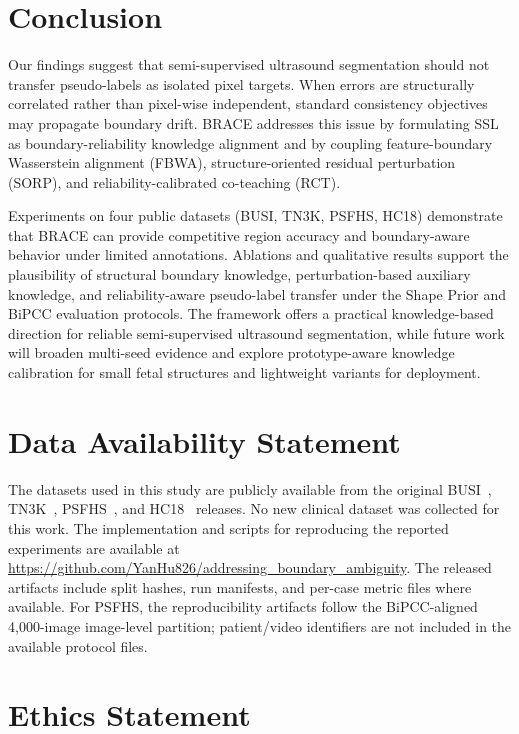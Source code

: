 \documentclass[a4paper,fleqn]{cas-dc}
\begin{document}
\section{Conclusion}

Our findings suggest that semi-supervised ultrasound segmentation should not transfer pseudo-labels as isolated pixel targets. When errors are structurally correlated rather than pixel-wise independent, standard consistency objectives may propagate boundary drift. BRACE addresses this issue by formulating SSL as boundary-reliability knowledge alignment and by coupling feature-boundary Wasserstein alignment (FBWA), structure-oriented residual perturbation (SORP), and reliability-calibrated co-teaching (RCT).

Experiments on four public datasets (BUSI, TN3K, PSFHS, HC18) demonstrate that BRACE can provide competitive region accuracy and boundary-aware behavior under limited annotations. Ablations and qualitative results support the plausibility of structural boundary knowledge, perturbation-based auxiliary knowledge, and reliability-aware pseudo-label transfer under the Shape Prior and BiPCC evaluation protocols. The framework offers a practical knowledge-based direction for reliable semi-supervised ultrasound segmentation, while future work will broaden multi-seed evidence and explore prototype-aware knowledge calibration for small fetal structures and lightweight variants for deployment.

\section{Data Availability Statement}

The datasets used in this study are publicly available from the original BUSI~\cite{b1}, TN3K~\cite{b4}, PSFHS~\cite{b53}, and HC18~\cite{b54} releases. No new clinical dataset was collected for this work. The implementation and scripts for reproducing the reported experiments are available at \url{https://github.com/YanHu826/addressing_boundary_ambiguity}. The released artifacts include split hashes, run manifests, and per-case metric files where available. For PSFHS, the reproducibility artifacts follow the BiPCC-aligned 4,000-image image-level partition; patient/video identifiers are not included in the available protocol files.

\section{Ethics Statement}
\end{document}
